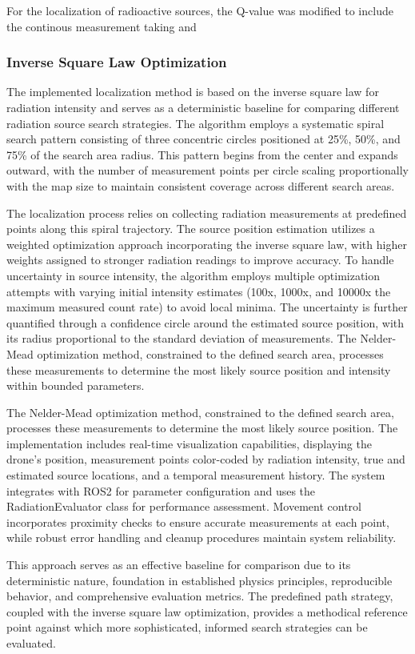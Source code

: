 \documentclass[../report.tex]{subfiles}
\begin{document}
    For the localization of radioactive sources, the Q-value was modified to include the continous measurement taking and 
    
    \subsubsection{Inverse Square Law Optimization}
    The implemented localization method is based on the inverse square law for radiation intensity and serves as a deterministic baseline for comparing different 
    radiation source search strategies. The algorithm employs a systematic spiral search pattern consisting of three concentric circles positioned at 25\%, 50\%, 
    and 75\% of the search area radius. This pattern begins from the center and expands outward, with the number of measurement points per circle scaling 
    proportionally with the map size to maintain consistent coverage across different search areas.
    \vspace{0.3cm}

    The localization process relies on collecting radiation measurements at predefined points along this spiral trajectory. The source position estimation utilizes a weighted optimization 
    approach incorporating the inverse square law, with higher weights assigned to stronger radiation readings to improve accuracy. To handle uncertainty in source intensity, the algorithm 
    employs multiple optimization attempts with varying initial intensity estimates (100x, 1000x, and 10000x the maximum measured count rate) to avoid local minima. The uncertainty is further
     quantified through a confidence circle around the estimated source position, with its radius proportional to the standard deviation of measurements. The Nelder-Mead optimization method, 
     constrained to the defined search area, processes these measurements to determine the most likely source position and intensity within bounded parameters. 
    \vspace{0.3cm}
    
    The Nelder-Mead optimization method, constrained to the defined search area, processes these measurements to determine the most likely source position.
    The implementation includes real-time visualization capabilities, displaying the drone's position, measurement points color-coded by radiation intensity, 
    true and estimated source locations, and a temporal measurement history. The system integrates with ROS2 for parameter configuration and uses the 
    RadiationEvaluator class for performance assessment. Movement control incorporates proximity checks to ensure accurate measurements at each point, while 
    robust error handling and cleanup procedures maintain system reliability.
    \vspace{0.3cm}

    This approach serves as an effective baseline for comparison due to its deterministic nature, foundation in established physics principles, reproducible 
    behavior, and comprehensive evaluation metrics. The predefined path strategy, coupled with the inverse square law optimization, provides a methodical reference
     point against which more sophisticated, informed search strategies can be evaluated.
\end{document}
